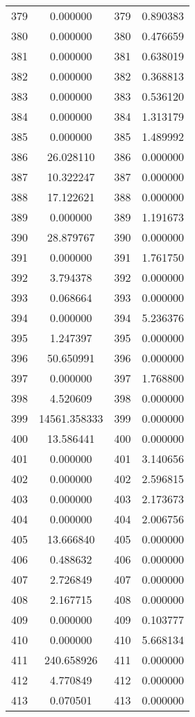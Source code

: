 \documentclass[12pt]{article}
\begin{document}
\begin{longtable}{@{}cccc@{}}
379 & 0.000000 & 379 & 0.890383 \\
380 & 0.000000 & 380 & 0.476659 \\
381 & 0.000000 & 381 & 0.638019 \\
382 & 0.000000 & 382 & 0.368813 \\
383 & 0.000000 & 383 & 0.536120 \\
384 & 0.000000 & 384 & 1.313179 \\
385 & 0.000000 & 385 & 1.489992 \\
386 & 26.028110 & 386 & 0.000000 \\
387 & 10.322247 & 387 & 0.000000 \\
388 & 17.122621 & 388 & 0.000000 \\
389 & 0.000000 & 389 & 1.191673 \\
390 & 28.879767 & 390 & 0.000000 \\
391 & 0.000000 & 391 & 1.761750 \\
392 & 3.794378 & 392 & 0.000000 \\
393 & 0.068664 & 393 & 0.000000 \\
394 & 0.000000 & 394 & 5.236376 \\
395 & 1.247397 & 395 & 0.000000 \\
396 & 50.650991 & 396 & 0.000000 \\
397 & 0.000000 & 397 & 1.768800 \\
398 & 4.520609 & 398 & 0.000000 \\
399 & 14561.358333 & 399 & 0.000000 \\
400 & 13.586441 & 400 & 0.000000 \\
401 & 0.000000 & 401 & 3.140656 \\
402 & 0.000000 & 402 & 2.596815 \\
403 & 0.000000 & 403 & 2.173673 \\
404 & 0.000000 & 404 & 2.006756 \\
405 & 13.666840 & 405 & 0.000000 \\
406 & 0.488632 & 406 & 0.000000 \\
407 & 2.726849 & 407 & 0.000000 \\
408 & 2.167715 & 408 & 0.000000 \\
409 & 0.000000 & 409 & 0.103777 \\
410 & 0.000000 & 410 & 5.668134 \\
411 & 240.658926 & 411 & 0.000000 \\
412 & 4.770849 & 412 & 0.000000 \\
413 & 0.070501 & 413 & 0.000000 \\

\end{longtable}
\end{document}
